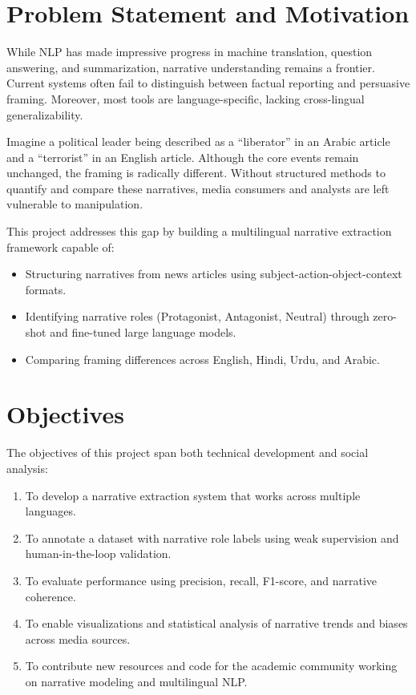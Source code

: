 \documentclass[12pt]{article}
\begin{document}
\section{Problem Statement and Motivation}

While NLP has made impressive progress in machine translation, question answering, and summarization, narrative understanding remains a frontier. Current systems often fail to distinguish between factual reporting and persuasive framing. Moreover, most tools are language-specific, lacking cross-lingual generalizability.

Imagine a political leader being described as a “liberator” in an Arabic article and a “terrorist” in an English article. Although the core events remain unchanged, the framing is radically different. Without structured methods to quantify and compare these narratives, media consumers and analysts are left vulnerable to manipulation.

This project addresses this gap by building a multilingual narrative extraction framework capable of:
\begin{itemize}
    \item Structuring narratives from news articles using subject-action-object-context formats.
    \item Identifying narrative roles (Protagonist, Antagonist, Neutral) through zero-shot and fine-tuned large language models.
    \item Comparing framing differences across English, Hindi, Urdu, and Arabic.
\end{itemize}

\section{Objectives}

The objectives of this project span both technical development and social analysis:
\begin{enumerate}
    \item To develop a narrative extraction system that works across multiple languages.
    \item To annotate a dataset with narrative role labels using weak supervision and human-in-the-loop validation.
    \item To evaluate performance using precision, recall, F1-score, and narrative coherence.
    \item To enable visualizations and statistical analysis of narrative trends and biases across media sources.
    \item To contribute new resources and code for the academic community working on narrative modeling and multilingual NLP.
\end{enumerate}
\end{document}
